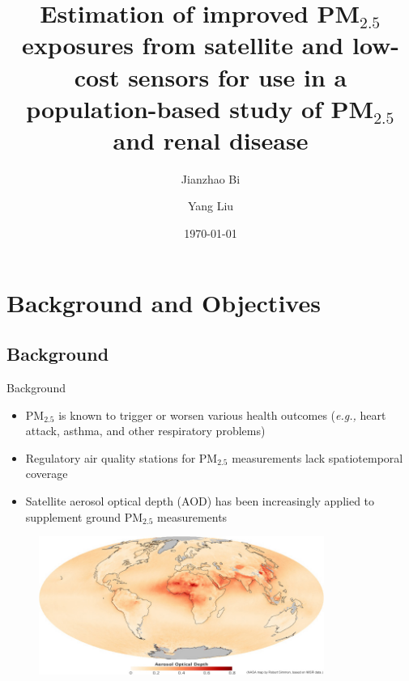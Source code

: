 \documentclass[handout]{beamer} %
\title[]{\large Estimation of improved PM$_{2.5}$ exposures from satellite and low-cost sensors for use in a population-based study of PM$_{2.5}$ and renal disease}
\author[]{Jianzhao Bi\inst{1} \and \textcolor[rgb]{0.1,0.6,0.1}{Yang Liu}\inst{1}\inst{*}}
\institute[Emory University] %
{
  \inst{1}%
  Environmental Health Sciences\\
  Emory University
 }
\date{\today}
\begin{document}
\begin{frame}
  \titlepage
\end{frame}

\section{Background and Objectives}
\subsection{Background}
\begin{frame}{Background}
    \begin{itemize}
        \item<1-> PM$_{2.5}$ is known to trigger or worsen various health outcomes (\textit{e.g.,} heart attack, asthma, and other respiratory problems)
        \item<2-> Regulatory air quality stations for PM$_{2.5}$ measurements lack spatiotemporal coverage
        \item<3-> Satellite aerosol optical depth (AOD) has been increasingly applied to supplement ground PM$_{2.5}$ measurements
    \end{itemize}
    \vspace{-0.25cm}
    \begin{figure}
        \centering
        \includegraphics[width=0.83\textwidth]{img/satellite_aod.jpg}
        \label{fig:pm25}
    \end{figure}
\end{frame}
\end{document}
